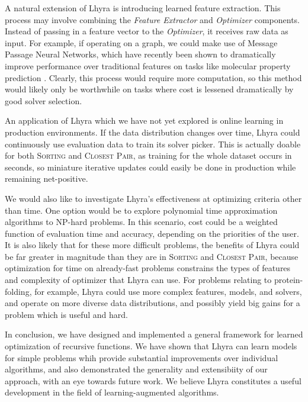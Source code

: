 \documentclass[11pt]{article}
\begin{document}
A natural extension of Lhyra is introducing learned feature extraction. This process may involve combining the \textit{Feature Extractor} and \textit{Optimizer} components. Instead of passing in a feature vector to the \textit{Optimizer}, it receives raw data as input. For example, if operating on a graph, we could make use of Message Passage Neural Networks, which have recently been shown to dramatically improve performance over traditional features on tasks like molecular property prediction \cite{GilmerSRVD17}. Clearly, this process would require more computation, so this method would likely only be worthwhile on tasks where cost is lessened dramatically by good solver selection.

An application of Lhyra which we have not yet explored is online learning in production environments.  If the data distribution changes over time, Lhyra could continuously use evaluation data to train its solver picker.  This is actually doable for both \textsc{Sorting} and \textsc{Closest Pair}, as training for the whole dataset occurs in seconds, so miniature iterative updates could easily be done in production while remaining net-positive.

We would also like to investigate Lhyra's effectiveness at optimizing criteria other than time. One option would be to explore polynomial time approximation algorithms to NP-hard problems. In this scenario, cost could be a weighted function of evaluation time and accuracy, depending on the priorities of the user. It is also likely that for these more difficult problems, the benefits of Lhyra could be far greater in magnitude than they are in \textsc{Sorting} and \textsc{Closest Pair}, because optimization for time on already-fast problems constrains the types of features and complexity of optimizer that Lhyra can use. For problems relating to protein-folding, for example, Lhyra could use more complex features, models, and solvers, and operate on more diverse data distributions, and possibly yield big gains for a problem which is useful and hard.

In conclusion, we have designed and implemented a general framework for learned optimization of recursive functions. We have shown that Lhyra can learn models for simple problems whih provide substantial improvements over individual algorithms, and also demonstrated the generality and extensibiity of our approach, with an eye towards future work. We believe Lhyra constitutes a useful development in the field of learning-augmented algorithms.
\end{document}
